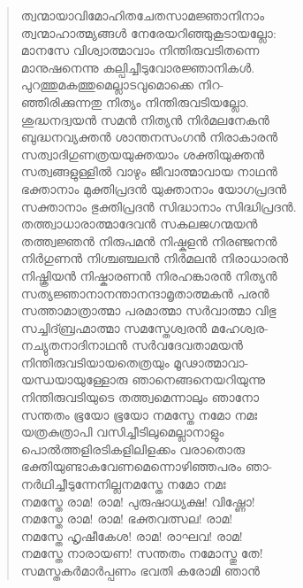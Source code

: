 \begin{verse}
ത്വന്മായാവിമോഹിതചേതസാമജ്ഞാനിനാം\\
ത്വന്മാഹാത്മ്യങ്ങള്‍ നേരേയറിഞ്ഞുകൂടായല്ലോ:\\
മാനസേ വിശ്വാത്മാവാം നിന്തിരുവടിതന്നെ\\
മാനുഷനെന്നു കല്പിച്ചീടുവോരജ്ഞാനികള്‍.\\
പുറത്തുമകത്തുമെല്ലാടവുമൊക്കെ നിറ-\\
ഞ്ഞിരിക്കുന്നതു നിത്യം നിന്തിരുവടിയല്ലോ.\\
ശുദ്ധനദ്വയന്‍ സമന്‍ നിത്യന്‍ നിര്‍മലനേകന്‍\\
ബുദ്ധനവ്യക്തന്‍ ശാന്തനസംഗന്‍ നിരാകാരന്‍\\
സത്വാദിഗുണത്രയയുക്തയാം ശക്തിയുക്തന്‍\\
സത്വങ്ങളുള്ളില്‍ വാഴും ജീവാത്മാവായ നാഥന്‍\\
ഭക്താനാം മുക്തിപ്രദന്‍ യുക്താനാം യോഗപ്രദന്‍\\
സക്താനാം ഭുക്തിപ്രദന്‍ സിദ്ധാനാം സിദ്ധിപ്രദന്‍.\\
തത്ത്വാധാരാത്മാദേവന്‍ സകലജഗന്മയന്‍\\
തത്ത്വജ്ഞന്‍ നിരുപമന്‍ നിഷ്കളന്‍ നിരഞ്ജനന്‍\\
നിര്‍ഗുണന്‍ നിശ്ചഞ്ചലന്‍ നിര്‍മലന്‍ നിരാധാരന്‍\\
നിഷ്ക്രിയന്‍ നിഷ്കാരണന്‍ നിരഹങ്കാരന്‍ നിത്യന്‍\\
സത്യജ്ഞാനാനന്താനന്ദാമൃതാത്മകന്‍ പരന്‍\\
സത്താമാത്രാത്മാ പരമാത്മാ സര്‍വാത്മാ വിഭു\\
സച്ചിദ്ബ്രഹ്മാത്മാ സമസ്തേശ്വരന്‍ മഹേശ്വര-\\
നച്യുതനാദിനാഥന്‍ സര്‍വദേവതാമയന്‍\\
നിന്തിരുവടിയായതെത്രയും മൂഢാത്മാവാ-\\
യന്ധയായുള്ളോരു ഞാനെങ്ങനെയറിയുന്നു\\
നിന്തിരുവടിയുടെ തത്ത്വമെന്നാലും ഞാനോ\\
സന്തതം ഭൂയോ ഭൂയോ നമസ്തേ നമോ നമഃ\\
യത്രകുത്രാപി വസിച്ചീടിലുമെല്ലാനാളും\\
പൊല്‍ത്തളിരടികളിലിളക്കം വരാതൊരു\\
ഭക്തിയുണ്ടാകവേണമെന്നൊഴിഞ്ഞപരം ഞാ-\\
നര്‍ഥിച്ചീടുന്നേനില്ലനമസ്തേ നമോ നമഃ\\
നമസ്തേ രാമ! രാമ! പുരുഷാധ്യക്ഷ! വിഷ്ണോ!\\
നമസ്തേ രാമ! രാമ! ഭക്തവത്സല! രാമ!\\
നമസ്തേ ഹൃഷീകേശ! രാമ! രാഘവ! രാമ!\\
നമസ്തേ നാരായണ! സന്തതം നമോസ്തു തേ!\\
സമസ്തകര്‍മാര്‍പ്പണം ഭവതി കരോമി ഞാന്‍\\

\end{verse}
